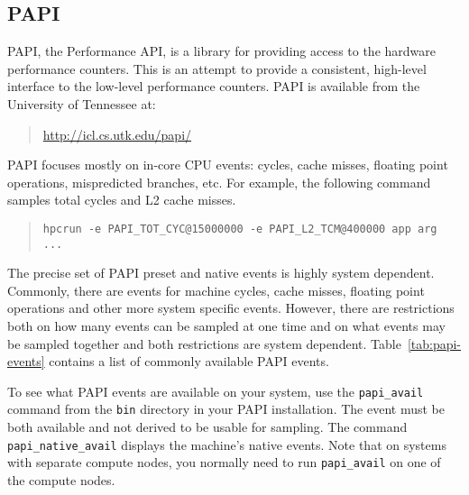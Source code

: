 \subsection{PAPI}

PAPI, the Performance API, is a library for providing access to the
hardware performance counters.  This is an attempt to provide a
consistent, high-level interface to the low-level performance
counters.  PAPI is available from the University of Tennessee at:

\begin{quote}
\url{http://icl.cs.utk.edu/papi/}
\end{quote}

PAPI focuses mostly on in-core CPU events: cycles, cache misses,
floating point operations, mispredicted branches, etc.  For example,
the following command samples total cycles and L2 cache misses.

\begin{quote}
\begin{verbatim}
hpcrun -e PAPI_TOT_CYC@15000000 -e PAPI_L2_TCM@400000 app arg ...
\end{verbatim}
\end{quote}

The precise set of PAPI preset and native events is highly system
dependent.  Commonly, there are events for machine cycles, cache
misses, floating point operations and other more system specific
events.  However, there are restrictions both on how many events can
be sampled at one time and on what events may be sampled together and
both restrictions are system dependent.  Table~\ref{tab:papi-events}
contains a list of commonly available PAPI events.

To see what PAPI events are available on your system, use the
\verb|papi_avail| command from the \verb|bin| directory in your PAPI
installation.  The event must be both available and not derived to be
usable for sampling.  The command \verb|papi_native_avail| displays
the machine's native events.  Note that on systems with separate
compute nodes, you normally need to run \verb|papi_avail| on one of
the compute nodes.

